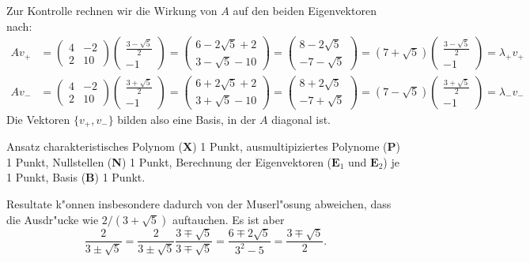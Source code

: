 \begin{loesung}
Zur Kontrolle rechnen wir die Wirkung von $A$ auf den beiden Eigenvektoren
nach:
\begin{align*}
Av_+
&=
\begin{pmatrix}4&-2\\2&10\end{pmatrix}
\begin{pmatrix}
\frac{3-\sqrt{5}}2\\-1
\end{pmatrix}
=
\begin{pmatrix}
6-2\sqrt{5}+2\\
3-\sqrt{5}-10
\end{pmatrix}
=
\begin{pmatrix}
8-2\sqrt{5}\\
-7-\sqrt{5}
\end{pmatrix}
=
(7+\sqrt{5})
\begin{pmatrix}
\frac{3-\sqrt{5}}2\\
-1
\end{pmatrix}
=
\lambda_+v_+
\\
Av_-
&=
\begin{pmatrix}4&-2\\2&10\end{pmatrix}
\begin{pmatrix}
\frac{3+\sqrt{5}}2\\-1
\end{pmatrix}
=
\begin{pmatrix}
6+2\sqrt{5}+2\\
3+\sqrt{5}-10
\end{pmatrix}
=
\begin{pmatrix}
8+2\sqrt{5}\\
-7+\sqrt{5}
\end{pmatrix}
=
(7-\sqrt{5})
\begin{pmatrix}
\frac{3+\sqrt{5}}2\\
-1
\end{pmatrix}
=
\lambda_-v_-
\end{align*}
Die Vektoren $\{v_+,v_-\}$ bilden also eine Basis, in der $A$ diagonal ist.
\end{loesung}

\begin{bewertung}
Ansatz charakteristisches Polynom ({\bf X}) 1 Punkt,
ausmultipiziertes Polynome ({\bf P}) 1 Punkt,
Nullstellen ({\bf N}) 1 Punkt,
Berechnung der Eigenvektoren ($\textbf{E}_1$ und $\textbf{E}_2$) je 1 Punkt,
Basis ({\bf B}) 1 Punkt.
\end{bewertung}

\begin{diskussion}
Resultate k"onnen insbesondere dadurch von der Muserl"osung abweichen,
dass die Ausdr"ucke wie $2/(3+\sqrt{5})$ auftauchen. Es ist aber
\[
\frac{2}{3\pm \sqrt{5}}
=
\frac{2}{3\pm \sqrt{5}}\frac{3\mp\sqrt{5}}{3\mp\sqrt{5}}
=
\frac{6\mp2\sqrt{5}}{3^2-5}
=
\frac{3\mp\sqrt{5}}2.
\]
\end{diskussion}


